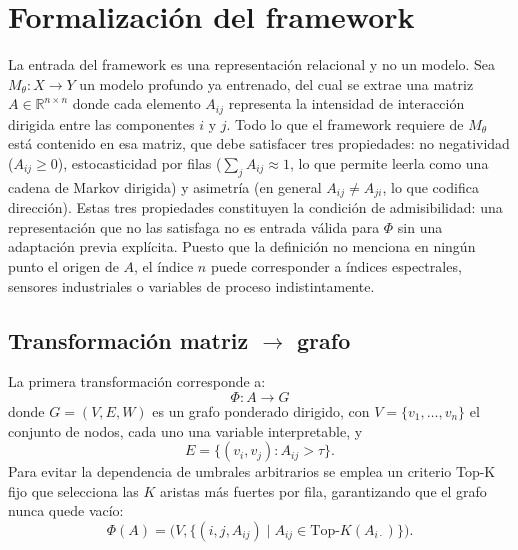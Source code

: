 
\section{Formalización del framework}

La entrada del framework es una representación relacional y no un modelo. Sea $M_\theta: X \to Y$ un modelo profundo ya entrenado, del cual se extrae una matriz $A \in \mathbb{R}^{n\times n}$ donde cada elemento $A_{ij}$ representa la intensidad de interacción dirigida entre las componentes $i$ y $j$. Todo lo que el framework requiere de $M_\theta$ está contenido en esa matriz, que debe satisfacer tres propiedades: no negatividad ($A_{ij} \geq 0$), estocasticidad por filas ($\sum_j A_{ij} \approx 1$, lo que permite leerla como una cadena de Markov dirigida) y asimetría (en general $A_{ij} \neq A_{ji}$, lo que codifica dirección). Estas tres propiedades constituyen la condición de admisibilidad: una representación que no las satisfaga no es entrada válida para $\Phi$ sin una adaptación previa explícita. Puesto que la definición no menciona en ningún punto el origen de $A$, el índice $n$ puede corresponder a índices espectrales, sensores industriales o variables de proceso indistintamente.

\subsection{Transformación matriz \texorpdfstring{$\to$}{->} grafo}

La primera transformación corresponde a:
\begin{equation}
\Phi: A \to G
\end{equation}
donde $G = (V, E, W)$ es un grafo ponderado dirigido, con $V = \{v_1, \ldots, v_n\}$ el conjunto de nodos, cada uno una variable interpretable, y
\begin{equation}
E = \{(v_i, v_j) : A_{ij} > \tau\}.
\end{equation}
Para evitar la dependencia de umbrales arbitrarios se emplea un criterio Top-K fijo que selecciona las $K$ aristas más fuertes por fila, garantizando que el grafo nunca quede vacío:
\begin{equation}
\Phi(A) = \big(V, \{(i,j,A_{ij}) \mid A_{ij} \in \text{Top-}K(A_{i\cdot})\}\big).
\end{equation}

